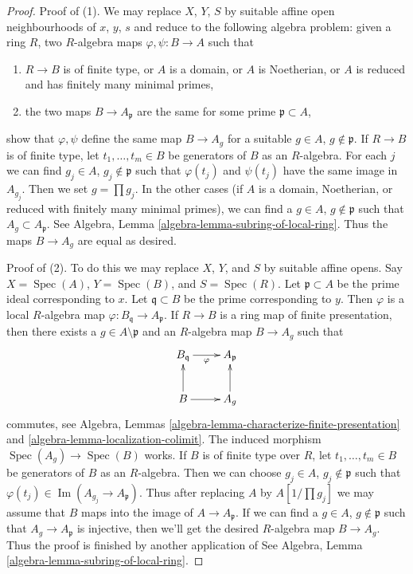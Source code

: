 \documentclass[10pt,a4paper]{amsart}
\theoremstyle{plain}
\theoremstyle{definition}
\theoremstyle{remark}
\numberwithin{equation}{subsection}
\def\Spec{\mathop{\mathrm{Spec}}}
\def\Im{\mathop{\mathrm{Im}}}
\begin{document}
\begin{proof}
Proof of (1). We may replace $X$, $Y$, $S$ by suitable affine open
neighbourhoods of $x$, $y$, $s$ and reduce to the following algebra
problem: given a ring $R$, two $R$-algebra maps $\varphi, \psi : B \to A$
such that
\begin{enumerate}
\item $R \to B$ is of finite type, or $A$ is a domain, or $A$
is Noetherian, or $A$ is reduced and has finitely many minimal primes,
\item the two maps $B \to A_\mathfrak p$ are the same for
some prime $\mathfrak p \subset A$,
\end{enumerate}
show that $\varphi, \psi$ define the same map $B \to A_g$ for
a suitable $g \in A$, $g \not \in \mathfrak p$. If $R \to B$ is of
finite type, let $t_1, \ldots, t_m \in B$ be generators of $B$
as an $R$-algebra. For each $j$ we can find
$g_j \in A$, $g_j \not \in \mathfrak p$
such that $\varphi(t_j)$ and $\psi(t_j)$ have the same image in
$A_{g_j}$. Then we set $g = \prod g_j$.
In the other cases (if $A$ is a domain, Noetherian, or reduced
with finitely many minimal primes), we can find a $g \in A$,
$g \not \in \mathfrak p$ such that $A_g \subset A_\mathfrak p$.
See Algebra, Lemma \ref{algebra-lemma-subring-of-local-ring}.
Thus the maps $B \to A_g$ are equal as desired.

\medskip\noindent
Proof of (2). To do this we may replace $X$, $Y$, and $S$ by suitable affine
opens. Say $X = \Spec(A)$, $Y = \Spec(B)$, and $S = \Spec(R)$.
Let $\mathfrak p \subset A$ be the prime ideal corresponding to $x$.
Let $\mathfrak q \subset B$ be the prime corresponding to $y$.
Then $\varphi$ is a local $R$-algebra map
$\varphi : B_\mathfrak q \to A_\mathfrak p$.
If $R \to B$ is a ring map of finite presentation, then there exists a
$g \in A \setminus \mathfrak p$ and an $R$-algebra map $B \to A_g$ such that
$$
\xymatrix{
B_\mathfrak q \ar[r]_\varphi & A_\mathfrak p \\
B \ar[u] \ar[r] & A_g \ar[u]
}
$$
commutes, see
Algebra, Lemmas \ref{algebra-lemma-characterize-finite-presentation} and
\ref{algebra-lemma-localization-colimit}.
The induced morphism $\Spec(A_g) \to \Spec(B)$ works.
If $B$ is of finite type over $R$, let $t_1, \ldots, t_m \in B$ be
generators of $B$ as an $R$-algebra. Then we can choose
$g_j \in A$, $g_j \not \in \mathfrak p$
such that $\varphi(t_j) \in \Im(A_{g_j} \to A_\mathfrak p)$.
Thus after replacing $A$ by $A[1/\prod g_j]$ we may assume
that $B$ maps into the image of $A \to A_\mathfrak p$.
If we can find a $g \in A$, $g \not \in \mathfrak p$
such that $A_g \to A_\mathfrak p$ is injective, then
we'll get the desired $R$-algebra map $B \to A_g$.
Thus the proof is finished by another application of
See Algebra, Lemma \ref{algebra-lemma-subring-of-local-ring}.
\end{proof}
\end{document}
